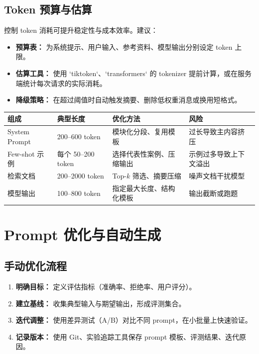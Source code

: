 \documentclass[UTF8,zihao=-4]{ctexart}
\begin{document}
\subsection{Token 预算与估算}
控制 token 消耗可提升稳定性与成本效率。建议：
\begin{itemize}
  \item \textbf{预算表：} 为系统提示、用户输入、参考资料、模型输出分别设定 token 上限。
  \item \textbf{估算工具：} 使用 `tiktoken`、`transformers` 的 tokenizer 提前计算，或在服务端统计每次请求的实际消耗。
  \item \textbf{降级策略：} 在超过阈值时自动触发摘要、删除低权重消息或换用短格式。
\end{itemize}
\begin{longtable}{p{3cm}p{3cm}p{4cm}p{4cm}}
\toprule
组成 & 典型长度 & 优化方法 & 风险 \\
\midrule
System Prompt & 200--600 token & 模块化分段、复用模板 & 过长导致主内容挤压 \\
Few-shot 示例 & 每个 50--200 token & 选择代表性案例、压缩输出 & 示例过多导致上下文溢出 \\
检索文档 & 200--2000 token & Top-$k$ 筛选、摘要压缩 & 噪声文档干扰模型 \\
模型输出 & 100--800 token & 指定最大长度、结构化模板 & 输出截断或跑题 \\
\bottomrule
\end{longtable}

\section{Prompt 优化与自动生成}
\subsection{手动优化流程}
\begin{enumerate}
  \item \textbf{明确目标：} 定义评估指标（准确率、拒绝率、用户评分）。
  \item \textbf{建立基线：} 收集典型输入与期望输出，形成评测集合。
  \item \textbf{迭代调整：} 使用差异测试（A/B）对比不同 prompt，在小批量上快速验证。
  \item \textbf{记录版本：} 使用 Git、实验追踪工具保存 prompt 模板、评测结果、迭代原因。
\end{enumerate}
\end{document}
